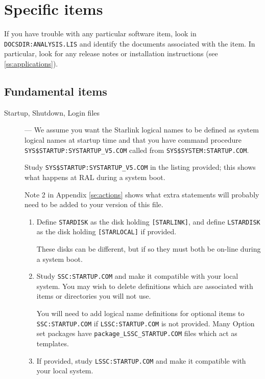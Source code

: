 \section {Specific items}
\label{se:specific}

If you have trouble with any particular software item, look in {\tt
DOCSDIR:\-ANALYSIS.\-LIS} and identify the documents associated with the item.
In particular, look for any release notes or installation instructions (see
\ref{ss:applications}).

\subsection{Fundamental items}
\label{ss:fundamental}

\begin{description}

\item [Startup, Shutdown, Login files] --- We assume you want the Starlink
logical names to be defined as system logical names at startup time and that
you have command procedure {\tt SYS\$STARTUP:SYSTARTUP\_V5.COM} called from 
{\tt SYS\$\-SYSTEM:\-STARTUP.\-COM}.

Study {\tt SYS\$STARTUP:SYSTARTUP\_V5.COM} in the listing provided; this shows
what happens at RAL during a system boot.

Note 2 in Appendix \ref{se:actions} shows what extra statements will probably
need to be added to your version of this file.

\begin{enumerate}
\item Define {\tt STARDISK} as the disk holding {\tt [STARLINK]},
and define {\tt LSTARDISK} as the disk holding {\tt [STARLOCAL]} if provided.

These disks can be different, but if so they must both be on-line during a
system boot.

\item Study {\tt SSC:STARTUP.COM} and make it compatible with your local system.
You may wish to delete definitions which are associated with items or
directories you will not use. 

You will need to add logical name definitions for optional items to {\tt
SSC:STARTUP.COM} if {\tt LSSC:STARTUP.COM} is not provided. Many Option set
packages have {\tt package\_LSSC\-\_STARTUP.COM} files which act as templates.

\item If provided, study {\tt LSSC:STARTUP.COM} and make it compatible with
your local system.


\end{enumerate}
\end{description}
